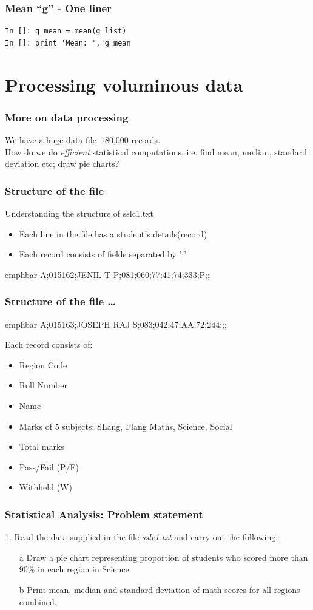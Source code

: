 \documentclass[14pt,compress]{beamer}
\newcommand{\emphbar}[1]
{\begin{beamercolorbox}[rounded=true]{emphbar} 
      {#1}
 \end{beamercolorbox}
}
\newcounter{time}
\newcommand{\inctime}[1]{\addtocounter{time}{#1}{\tiny \thetime\ m}}
\begin{document}
\begin{frame}[fragile]
  \frametitle{Mean ``g'' - One liner}
  \begin{lstlisting}
In []: g_mean = mean(g_list)
In []: print 'Mean: ', g_mean
  \end{lstlisting}
  \inctime{10}
\end{frame}

\section{Processing voluminous data}
\begin{frame}
  \frametitle{More on data processing}
  \begin{block}{}
    We have a huge data file--180,000 records.\\How do we do \emph{efficient} statistical computations, i.e. find mean, median, standard deviation etc; draw pie charts?
  \end{block}
\end{frame}

\begin{frame}
  \frametitle{Structure of the file}
  Understanding the structure of sslc1.txt
  \begin{itemize}
    \item Each line in the file has a student's details(record)
    \item Each record consists of fields separated by ';'
  \end{itemize}
\emphbar{A;015162;JENIL T P;081;060;77;41;74;333;P;;}
\end{frame}

\begin{frame}
  \frametitle{Structure of the file \ldots}
\emphbar{A;015163;JOSEPH RAJ S;083;042;47;AA;72;244;;;}
  Each record consists of:
  \begin{itemize}
    \item Region Code
    \item Roll Number
    \item Name
    \item Marks of 5 subjects: SLang, Flang Maths, Science, Social
    \item Total marks
    \item Pass/Fail (P/F)
    \item Withheld (W)
  \end{itemize}
  \inctime{5}
\end{frame}

\begin{frame}
  \frametitle{Statistical Analysis: Problem statement}
  1. Read the data supplied in the file \emph{sslc1.txt} and carry out the following:
  \begin{itemize}
    \item[a] Draw a pie chart representing proportion of students who scored more than 90\% in each region in Science.
    \item[b] Print mean, median and standard deviation of math scores for all regions combined.
  \end{itemize}
\end{frame}
\end{document}
